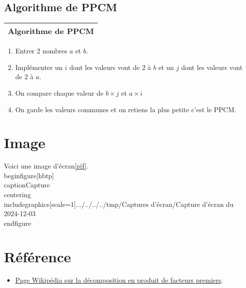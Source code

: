 \documentclass[titlepage]{article}
\begin{document}
\subsection{Algorithme de PPCM}
\begin{tabular}{l}
\hline
Algorithme de PPCM\\
\hline 
\end{tabular}
\begin{enumerate}
\item Entrer 2 nombres $a$ et $b$.
\item Implémenter un $i$ dont les valeurs vont de $2$ à $b$ et un $j$ dont les valeurs vont de $2$ à $a$.
\item On compare chaque valeur de $b \times j$ et $a \times i$
\item On garde les valeurs communes et on retiens la plus petite c'est le PPCM.
\end{enumerate}

\section{Image}
Voici une image {d'écran}\ref{réf}.\\
begin{figure}[hbtp]\\
caption{Capture}\label{réf}\\
centering\\
includegraphics[scale=1]{.../../../../tmp/Captures d’écran/Capture d’écran du 2024-12-03}\\
end{figure}\\

\section{Référence}
\begin{itemize}
    \item \href{https://fr.wikipedia.org/wiki/Décomposition_en_produit_de_facteurs_premiers}{Page Wikipédia sur la décomposition en produit de facteurs premiers}.
\end{itemize}
\end{document}
